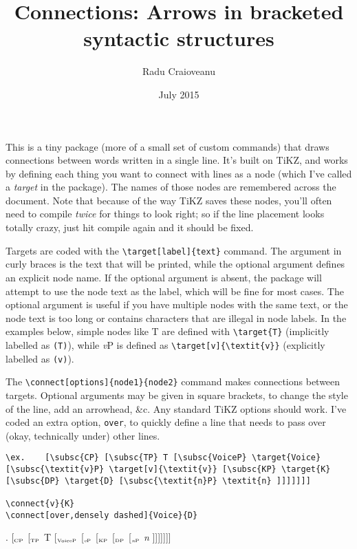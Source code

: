 \documentclass{article}
\title{Connections: Arrows in bracketed syntactic structures}
\author{Radu Craioveanu}
\date{July 2015}
\newcommand{\subsc}[1]{$_{\textrm{\tiny #1}}$}
\begin{document}
\maketitle

This is a tiny package (more of a small set of custom commands) that draws connections between words written in a single line. It's built on TiKZ, and works by defining each thing you want to connect with lines as a node (which I've called a \textit{target} in the package). The names of those nodes are remembered across the document.
Note that because of the way TiKZ saves these nodes, you'll often need to compile \textit{twice} for things to look right; so if the line placement looks totally crazy, just hit compile again and it should be fixed.

Targets are coded with the \verb;\target[label]{text}; command. The argument in curly braces is the text that will be printed, while the optional argument defines an explicit node name. If the optional argument is absent, the package will attempt to use the node text as the label, which will be fine for most cases. The optional argument is useful if you have multiple nodes with the same text, or the node text is too long or contains characters that are illegal in node labels. In the examples below, simple nodes like T are defined with \verb;\target{T}; (implicitly labelled as \texttt{(T)}), while \textit{v}P is defined as \verb;\target[v]{\textit{v}}; (explicitly labelled as \texttt{(v)}).

The \verb;\connect[options]{node1}{node2}; command makes connections between targets. Optional arguments may be given in square brackets, to change the style of the line, add an arrowhead, \&c. Any standard TiKZ options should work. I've coded an extra option, \verb;over;, to quickly define a line that needs to pass over (okay, technically under) other lines.

\begin{verbatim}
\ex.	[\subsc{CP} [\subsc{TP} T [\subsc{VoiceP} \target{Voice} 
[\subsc{\textit{v}P} \target[v]{\textit{v}} [\subsc{KP} \target{K} 
[\subsc{DP} \target{D} [\subsc{\textit{n}P} \textit{n} ]]]]]]]

\connect{v}{K}
\connect[over,densely dashed]{Voice}{D}
\end{verbatim}

\ex.	[\subsc{CP} [\subsc{TP} T [\subsc{VoiceP}  [\subsc{\textit{v}P}  [\subsc{KP}  [\subsc{DP}  [\subsc{\textit{n}P} \textit{n} ]]]]]]]
\end{document}
